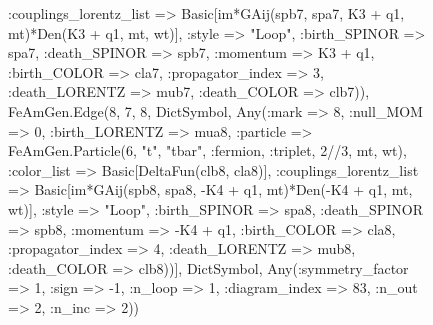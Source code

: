 \documentclass{revtex4}
\begin{document}
\begin{figure}[!htb]
\begin{center}
{:couplings_lorentz_list => Basic[im*GAij(spb7, spa7, K3 + q1, mt)*Den(K3 + q1, mt, wt)], :style => "Loop", :birth_SPINOR => spa7, :death_SPINOR => spb7, :momentum => K3 + q1, :birth_COLOR => cla7, :propagator_index => 3, :death_LORENTZ => mub7, :death_COLOR => clb7)), FeAmGen.Edge(8, 7, 8, Dict{Symbol, Any}(:mark => 8, :null_MOM => 0, :birth_LORENTZ => mua8, :particle => FeAmGen.Particle(6, "t", "tbar", :fermion, :triplet, 2//3, mt, wt), :color_list => Basic[DeltaFun(clb8, cla8)], :couplings_lorentz_list => Basic[im*GAij(spb8, spa8, -K4 + q1, mt)*Den(-K4 + q1, mt, wt)], :style => "Loop", :birth_SPINOR => spa8, :death_SPINOR => spb8, :momentum => -K4 + q1, :birth_COLOR => cla8, :propagator_index => 4, :death_LORENTZ => mub8, :death_COLOR => clb8))], Dict{Symbol, Any}(:symmetry_factor => 1, :sign => -1, :n_loop => 1, :diagram_index => 83, :n_out => 2, :n_inc => 2)) 
}
\end{center}
\end{figure}
\end{document}
